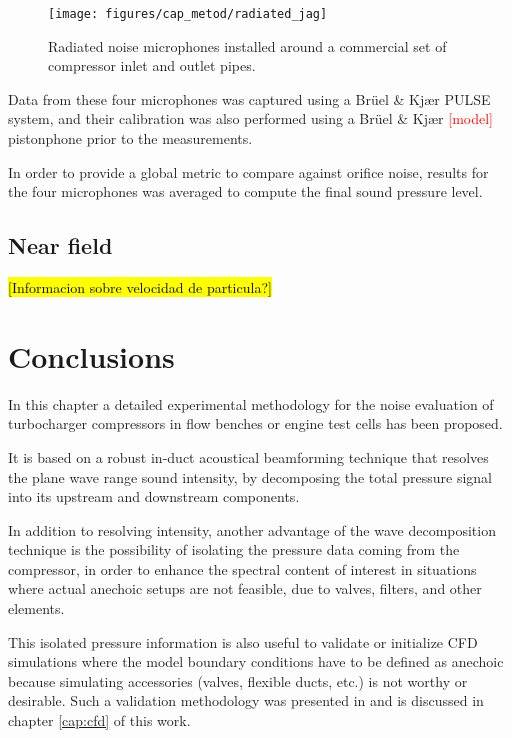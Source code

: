 \begin{figure*}[tb!]
\centering
\texttt{[image: figures/cap\_metod/radiated\_jag]}
\caption{Radiated noise microphones installed around a commercial set of compressor inlet and outlet pipes.}
\label{fig:radiated_jag}
\end{figure*}

Data from these four microphones was captured using a Brüel \& Kjær PULSE system, and their calibration was also performed using a Brüel \& Kjær \textcolor{red}{[model]} pistonphone prior to the measurements.

In order to provide a global metric to compare against orifice noise, results for the four microphones was averaged to compute the final sound pressure level.

\subsection{Near field}

\hl{[Informacion sobre velocidad de particula?]}

\section{Conclusions}
\label{sec:conclusions}

In this chapter a detailed experimental methodology for the noise evaluation of turbocharger compressors in flow benches \cite{broatch2015simulations} or engine test cells \cite{torregrosa2014aco} has been proposed.

It is based on a robust in-duct acoustical beamforming technique that resolves the plane wave range sound intensity, by decomposing the total pressure signal into its upstream and downstream components.

In addition to resolving intensity, another advantage of the wave decomposition technique is the possibility of isolating the pressure data coming from the compressor, in order to enhance the spectral content of interest in situations where actual anechoic setups are not feasible, due to valves, filters, and other elements.

This isolated pressure information is also useful to validate or initialize CFD simulations where the model boundary conditions have to be defined as anechoic because simulating accessories (valves, flexible ducts, etc.) is not worthy or desirable. Such a validation methodology was presented in \cite{broatch2014methodology} and is discussed in chapter \ref{cap:cfd} of this work.

